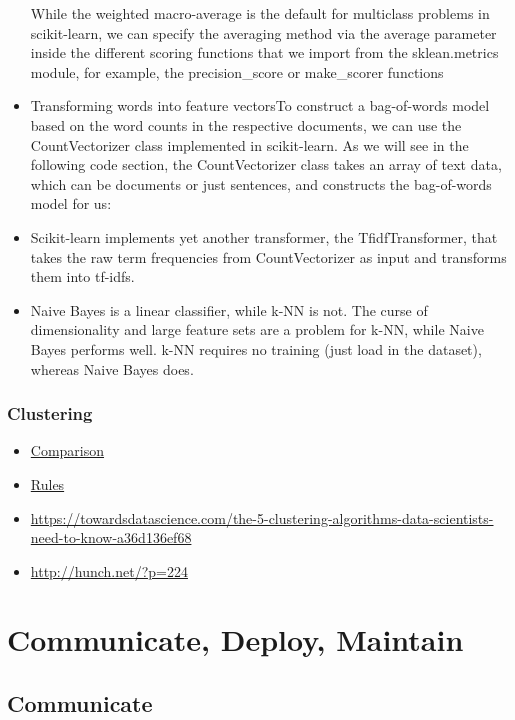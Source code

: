 \documentclass[]{book}
\theoremstyle{definition}
\theoremstyle{definition}
\theoremstyle{definition}
\theoremstyle{remark}
\begin{document}
\begin{itemize}
  While the weighted macro-average is the default for multiclass
  problems in scikit-learn, we can specify the averaging method via the
  average parameter inside the different scoring functions that we
  import from the sklean.metrics module, for example, the
  precision\_score or make\_scorer functions
\item
  Transforming words into feature vectorsTo construct a bag-of-words
  model based on the word counts in the respective documents, we can use
  the CountVectorizer class implemented in scikit-learn. As we will see
  in the following code section, the CountVectorizer class takes an
  array of text data, which can be documents or just sentences, and
  constructs the bag-of-words model for us:
\item
  Scikit-learn implements yet another transformer, the TfidfTransformer,
  that takes the raw term frequencies from CountVectorizer as input and
  transforms them into tf-idfs.
\item
  Naive Bayes is a linear classifier, while k-NN is not. The curse of
  dimensionality and large feature sets are a problem for k-NN, while
  Naive Bayes performs well. k-NN requires no training (just load in the
  dataset), whereas Naive Bayes does.
\end{itemize}

\subsection{Clustering}\label{clustering}

\begin{itemize}
\item
  \href{http://scikit-learn.org/stable/modules/clustering.html\#clustering}{Comparison}
\item
  \href{https://twitter.com/thomaswdinsmore/status/965223193043718145}{Rules}
\item
  \url{https://towardsdatascience.com/the-5-clustering-algorithms-data-scientists-need-to-know-a36d136ef68}
\item
  \url{http://hunch.net/?p=224}
\end{itemize}

\chapter{Communicate, Deploy,
Maintain}\label{communicate-deploy-maintain}

\section{Communicate}\label{communicate-1}
\end{document}
